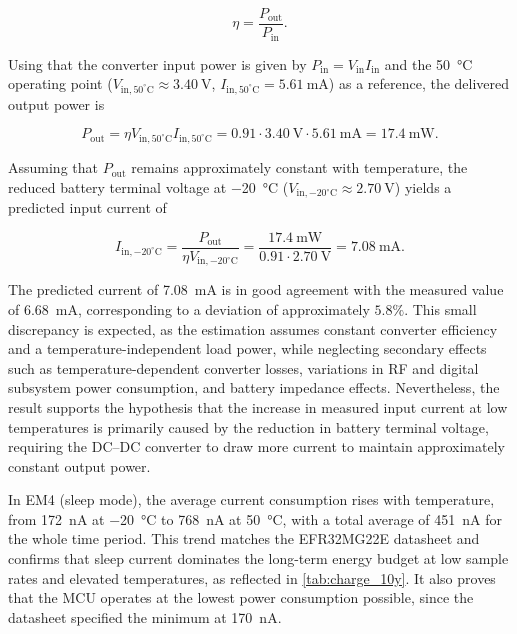 \begin{equation}
    \eta = \frac{P_{\mathrm{out}}}{P_{\mathrm{in}}}.
\end{equation}

Using that the converter input power is given by \(P_{\mathrm{in}} = V_{\mathrm{in}} I_{\mathrm{in}}\) and the \SI{50}{\celsius} operating point (\(V_{\mathrm{in},50^\circ\mathrm{C}} \approx \SI{3.40}{\volt}\), \(I_{\mathrm{in},50^\circ\mathrm{C}} = \SI{5.61}{\milli\ampere}\)) as a reference, the delivered output power is

\begin{equation}
    P_{\mathrm{out}}
    = \eta V_{\mathrm{in},50^\circ\mathrm{C}} I_{\mathrm{in},50^\circ\mathrm{C}}
    = 0.91 \cdot \SI{3.40}{\volt} \cdot \SI{5.61}{\milli\ampere}
    = \SI{17.4}{\milli\watt}.
\end{equation}

Assuming that \(P_{\mathrm{out}}\) remains approximately constant with temperature, the reduced battery terminal voltage at \SI{-20}{\celsius} (\(V_{\mathrm{in},-20^\circ\mathrm{C}} \approx \SI{2.70}{\volt}\)) yields a predicted input current of

\begin{equation}
    I_{\mathrm{in},-20^\circ\mathrm{C}}
    = \frac{P_{\mathrm{out}}}{\eta V_{\mathrm{in},-20^\circ\mathrm{C}}}
    = \frac{\SI{17.4}{\milli\watt}}
           {0.91 \cdot \SI{2.70}{\volt}}
    = \SI{7.08}{\milli\ampere}.
\end{equation}

The predicted current of \SI{7.08}{\milli\ampere} is in good agreement with the measured value of \SI{6.68}{\milli\ampere}, corresponding to a deviation of approximately \(5.8\%\). This small discrepancy is expected, as the estimation assumes constant converter efficiency and a temperature-independent load power, while neglecting secondary effects such as temperature-dependent converter losses, variations in RF and digital subsystem power consumption, and battery impedance effects. Nevertheless, the result supports the hypothesis that the increase in measured input current at low temperatures is primarily caused by the reduction in battery terminal voltage, requiring the DC--DC converter to draw more current to maintain approximately constant output power.

In EM4 (sleep mode), the average current consumption rises with temperature, from \SI{172}{\nano\ampere} at \SI{-20}{\celsius} to \SI{768}{\nano\ampere} at \SI{+50}{\celsius}, with a total average of \SI{451}{\nano\ampere} for the whole time period. This trend matches the EFR32MG22E datasheet and confirms that sleep current dominates the long-term energy budget at low sample rates and elevated temperatures, as reflected in \autoref{tab:charge_10y}. It also proves that the MCU operates at the lowest power consumption possible, since the datasheet specified the minimum at \SI{170}{\nano\ampere}. 

